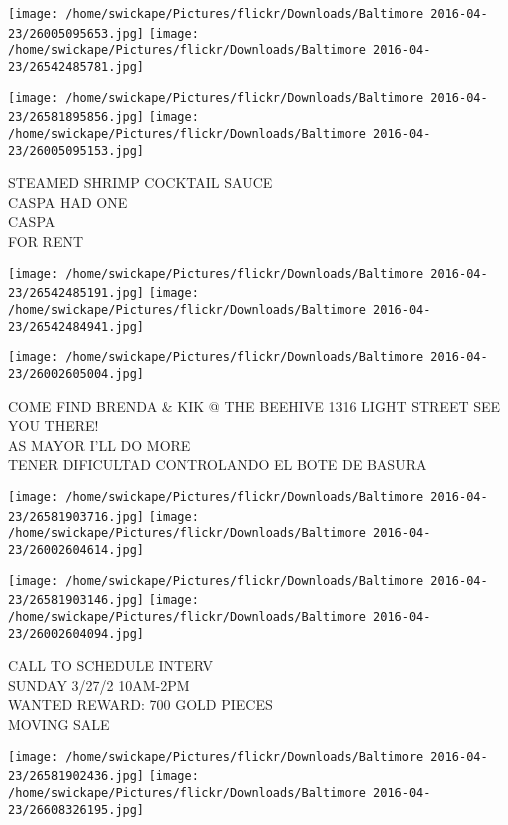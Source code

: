 \documentclass[10pt,letterpaper]{article}
\begin{document}
\texttt{[image: /home/swickape/Pictures/flickr/Downloads/Baltimore 2016-04-23/26005095653.jpg]}
\texttt{[image: /home/swickape/Pictures/flickr/Downloads/Baltimore 2016-04-23/26542485781.jpg]}

\texttt{[image: /home/swickape/Pictures/flickr/Downloads/Baltimore 2016-04-23/26581895856.jpg]}
\texttt{[image: /home/swickape/Pictures/flickr/Downloads/Baltimore 2016-04-23/26005095153.jpg]}

STEAMED SHRIMP COCKTAIL SAUCE\\
CASPA HAD ONE\\
CASPA\\
FOR RENT\\
\pagebreak

\texttt{[image: /home/swickape/Pictures/flickr/Downloads/Baltimore 2016-04-23/26542485191.jpg]}
\texttt{[image: /home/swickape/Pictures/flickr/Downloads/Baltimore 2016-04-23/26542484941.jpg]}

\vspace{0.25in}
\texttt{[image: /home/swickape/Pictures/flickr/Downloads/Baltimore 2016-04-23/26002605004.jpg]}

COME FIND BRENDA \& KIK @ THE BEEHIVE 1316 LIGHT STREET SEE YOU THERE!\\
AS MAYOR I'LL DO MORE\\
TENER DIFICULTAD CONTROLANDO EL BOTE DE BASURA\\
\pagebreak

\texttt{[image: /home/swickape/Pictures/flickr/Downloads/Baltimore 2016-04-23/26581903716.jpg]}
\texttt{[image: /home/swickape/Pictures/flickr/Downloads/Baltimore 2016-04-23/26002604614.jpg]}

\texttt{[image: /home/swickape/Pictures/flickr/Downloads/Baltimore 2016-04-23/26581903146.jpg]}
\texttt{[image: /home/swickape/Pictures/flickr/Downloads/Baltimore 2016-04-23/26002604094.jpg]}

CALL TO SCHEDULE INTERV\\
SUNDAY 3/27/2 10AM{-}2PM\\
WANTED REWARD: 700 GOLD PIECES\\
MOVING SALE\\
\pagebreak

\texttt{[image: /home/swickape/Pictures/flickr/Downloads/Baltimore 2016-04-23/26581902436.jpg]}
\texttt{[image: /home/swickape/Pictures/flickr/Downloads/Baltimore 2016-04-23/26608326195.jpg]}
\end{document}
